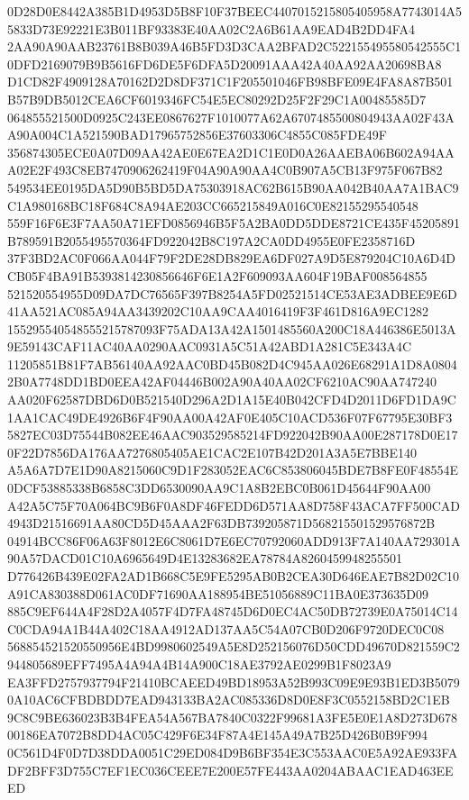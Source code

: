 \documentclass[UTF8,fontset=fandol,zihao=-4,a4paper]{ctexart}
\begin{document}
{{0D28D0E8442A385B1D4953D5B8F10F37BEEC4407015215805405958A7743014A55833D73E92221E3B011BF93383E40AA02C2A6B61AA9EAD4B2DD4FA4
2AA90A90AAB23761B8B039A46B5FD3D3CAA2BFAD2C522155495580542555C10DFD2169079B9B5616FD6DE5F6DFA5D20091AAA42A40AA92AA20698BA8
D1CD82F4909128A70162D2D8DF371C1F205501046FB98BFE09E4FA8A87B501B57B9DB5012CEA6CF6019346FC54E5EC80292D25F2F29C1A00485585D7
064855521500D0925C243EE0867627F1010077A62A6707485500804943AA02F43AA90A004C1A521590BAD17965752856E37603306C4855C085FDE49F
356874305ECE0A07D09AA42AE0E67EA2D1C1E0D0A26AAEBA06B602A94AAA02E2F493C8EB7470906262419F04A90A90AA4C0B907A5CB13F975F067B82
549534EE0195DA5D90B5BD5DA75303918AC62B615B90AA042B40AA7A1BAC9C1A980168BC18F684C8A94AE203CC665215849A016C0E82155295540548
559F16F6E3F7AA50A71EFD0856946B5F5A2BA0DD5DDE8721CE435F45205891B789591B2055495570364FD922042B8C197A2CA0DD4955E0FE2358716D
37F3BD2AC0F066AA044F79F2DE28DB829EA6DF027A9D5E879204C10A6D4DCB05F4BA91B5393814230856646F6E1A2F609093AA604F19BAF008564855
521520554955D09DA7DC76565F397B8254A5FD02521514CE53AE3ADBEE9E6D41AA521AC085A94AA3439202C10AA9CAA4016419F3F461D816A9EC1282
155295540548555215787093F75ADA13A42A1501485560A200C18A446386E5013A9E59143CAF11AC40AA0290AAC0931A5C51A42ABD1A281C5E343A4C
11205851B81F7AB56140AA92AAC0BD45B082D4C945AA026E68291A1D8A08042B0A7748DD1BD0EEA42AF04446B002A90A40AA02CF6210AC90AA747240
AA020F62587DBD6D0B521540D296A2D1A15E40B042CFD4D2011D6FD1DA9C1AA1CAC49DE4926B6F4F90AA00A42AF0E405C10ACD536F07F67795E30BF3
5827EC03D75544B082EE46AAC903529585214FD922042B90AA00E287178D0E170F22D7856DA176AA7276805405AE1CAC2E107B42D201A3A5E7BBE140
A5A6A7D7E1D90A8215060C9D1F283052EAC6C853806045BDE7B8FE0F48554E0DCF53885338B6858C3DD6530090AA9C1A8B2EBC0B061D45644F90AA00
A42A5C75F70A064BC9B6F0A8DF46FEDD6D571AA8D758F43ACA7FF500CAD4943D21516691AA80CD5D45AAA2F63DB739205871D568215501529576872B
04914BCC86F06A63F8012E6C8061D7E6EC70792060ADD913F7A140AA729301A90A57DACD01C10A6965649D4E13283682EA78784A8260459948255501
D776426B439E02FA2AD1B668C5E9FE5295AB0B2CEA30D646EAE7B82D02C10A91CA830388D061AC0DF71690AA188954BE51056889C11BA0E373635D09
885C9EF644A4F28D2A4057F4D7FA48745D6D0EC4AC50DB72739E0A75014C14C0CDA94A1B44A402C18AA4912AD137AA5C54A07CB0D206F9720DEC0C08
568854521520550956E4BD9980602549A5E8D252156076D50CDD49670D821559C2944805689EFF7495A4A94A4B14A900C18AE3792AE0299B1F8023A9
EA3FFD2757937794F21410BCAEED49BD18953A52B993C09E9E93B1ED3B50790A10AC6CFBDBDD7EAD943133BA2AC085336D8D0E8F3C0552158BD2C1EB
9C8C9BE636023B3B4FEA54A567BA7840C0322F99681A3FE5E0E1A8D273D67800186EA7072B8DD4AC05C429F6E34F87A4E145A49A7B25D426B0B9F994
0C561D4F0D7D38DDA0051C29ED084D9B6BF354E3C553AAC0E5A92AE933FADF2BFF3D755C7EF1EC036CEEE7E200E57FE443AA0204ABAAC1EAD463EEED
}}
\end{document}
